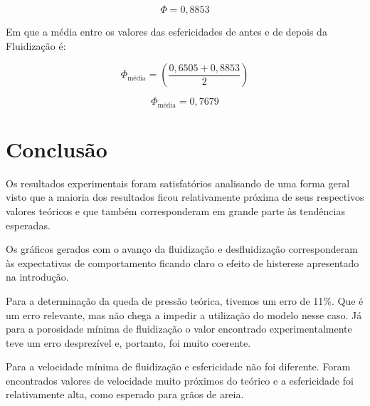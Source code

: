 \begin{equation}\label{key}
\Phi=0,8853
\end{equation}

Em que a média entre os valores das esfericidades de antes e de depois da Fluidização é: 

\begin{equation}\label{key}
\Phi _{\text{média}}=\left(\frac{0,6505+0,8853}{2}\right)
\end{equation}

\begin{equation}\label{key}
\Phi _{\text{média}}=0,7679
\end{equation}

\chapter{Conclusão}

Os resultados experimentais foram satisfatórios analisando de uma forma geral visto que a maioria dos resultados ficou relativamente próxima de seus respectivos valores teóricos e que também corresponderam em grande parte às tendências esperadas.

Os gráficos gerados com o avanço da fluidização e desfluidização corresponderam às expectativas de comportamento ficando claro o efeito de histerese apresentado na introdução.

Para a determinação da queda de pressão teórica, tivemos um erro de 11\%. Que é um erro relevante, mas não chega a impedir a utilização do modelo nesse caso. Já para a porosidade mínima de fluidização o valor encontrado experimentalmente teve um erro desprezível e, portanto, foi muito coerente.

Para a velocidade mínima de fluidização e esfericidade não foi diferente. Foram encontrados valores de velocidade muito próximos do teórico e a esfericidade foi relativamente alta, como esperado para grãos de areia.


